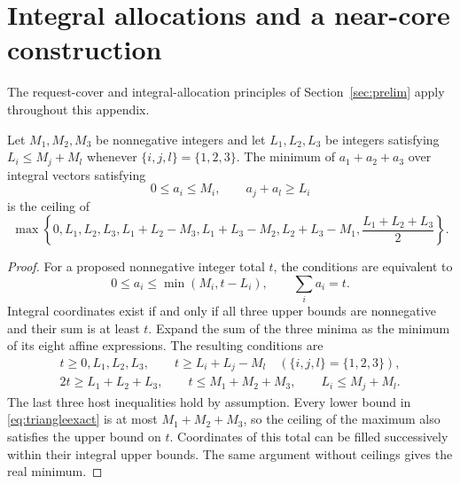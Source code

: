 \section{Integral allocations and a near-core construction}\label{app:allocation}
The request-cover and integral-allocation principles of
Section~\ref{sec:prelim} apply throughout this appendix.

\begin{lemma}\label{lem:triangle}
Let $M_1,M_2,M_3$ be nonnegative integers and let $L_1,L_2,L_3$ be
integers satisfying $L_i\le M_j+M_l$ whenever $\{i,j,l\}=\{1,2,3\}$.
The minimum of $a_1+a_2+a_3$ over integral vectors satisfying
\[
 0\le a_i\le M_i,\qquad a_j+a_l\ge L_i
\]
is the ceiling of
\begin{equation}\label{eq:triangleexact}
 \max\left\{0,L_1,L_2,L_3,
 L_1+L_2-M_3,L_1+L_3-M_2,L_2+L_3-M_1,
 \frac{L_1+L_2+L_3}{2}\right\}.
\end{equation}
\end{lemma}
\begin{proof}
For a proposed nonnegative integer total $t$, the conditions are equivalent to
\[
 0\le a_i\le\min(M_i,t-L_i),\qquad \sum_i a_i=t.
\]
Integral coordinates exist if and only if all three upper bounds are
nonnegative and their sum is at least $t$. Expand the sum of the three
minima as the minimum of its eight affine expressions. The resulting
conditions are
\begin{gather*}
 t\ge0,L_1,L_2,L_3,\qquad
 t\ge L_i+L_j-M_l\quad(\{i,j,l\}=\{1,2,3\}),\\
 2t\ge L_1+L_2+L_3,\qquad t\le M_1+M_2+M_3,\qquad
 L_i\le M_j+M_l.
\end{gather*}
The last three host inequalities hold by assumption. Every lower bound
in \eqref{eq:triangleexact} is at most $M_1+M_2+M_3$, so the ceiling of
the maximum also satisfies the upper bound on $t$. Coordinates of this
total can be filled successively within their integral upper bounds.
The same argument without ceilings gives the real minimum.
\end{proof}

